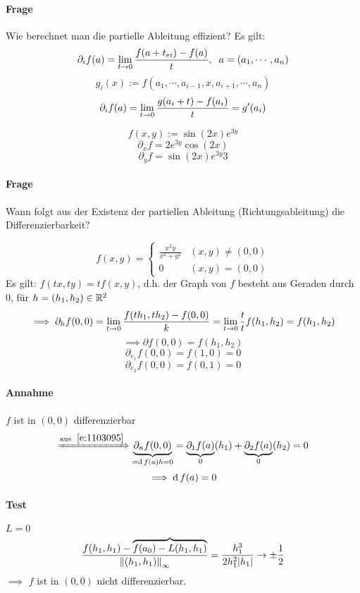 \paragraph{Frage}
Wie berechnet man die partielle Ableitung effizient? Es gilt:
\[\partial_if(a)=\displaystyle\lim_{t\rightarrow0}\frac{f(a+t_{ei})-f(a)}{t},\hspace{2mm} a=(a_1,\cdots,a_n)\]
\[g_i(x):=f(a_1,\cdots,a_{i-1},x,a_{i+1},\cdots,a_n)\]
\[\partial_if(a)=\displaystyle\lim_{t\rightarrow0}\frac{g(a_i+t)-f(a_i)}{t}=g'(a_i)\]
\begin{Bsp}
  \[f(x,y):=\sin(2x)e^{3y}\]
  \[\partial_xf=2e^{3y}\cos(2x)\]
  \[\partial_yf=\sin(2x)e^{3y}3\]
\end{Bsp}
\paragraph{Frage}
Wann folgt aus der Existenz der partiellen Ableitung (Richtungsableitung) die Differenzierbarkeit?
\begin{Bsp}
  \[f(x,y)= \begin{cases}
    \frac{x^2y}{x^2+y^2}&(x,y)\neq(0,0)\\
    0&(x,y)=(0,0)
  \end{cases}\]
  Es gilt: $f(tx,ty)=tf(x,y)$, d.h. der Graph von $f$ besteht aus Geraden durch $0$, für $h=(h_1,h_2)\in\mathbb{R}^2$
  \[\implies \partial_hf(0,0)=\displaystyle\lim_{t\rightarrow0}\frac{f(th_1,th_2)-f(0,0)}{k}=\displaystyle\lim_{t\rightarrow0}\frac{t}{t}f(h_1,h_2)=f(h_1,h_2)\]
  \[\implies \partial f(0,0)=f(h_1,h_2)\]
  \[\partial_{e_1}f(0,0)=f(1,0)=0\]
  \[\partial_{e_2}f(0,0)=f(0,1)=0\]
  \paragraph{Annahme}
  $f$ ist in $(0,0)$ differenzierbar
  \[\xRightarrow{\text{aus}\hspace{2mm}\ref{e:1103095}}\underbrace{\partial_nf(0,0)}_{=\operatorname{d} f(a)h=0}=\underbrace{\partial_1f(a)}_{0}(h_1)+\underbrace{\partial_2f(a)}_0(h_2)=0\]
  \[\implies \operatorname{d} f(a)=0\]
  \paragraph{Test}
  $L=0$
  \[\frac{f(h_1,h_1)-\overbrace{f(a_0)-L(h_1,h_1)}}{\left\| (h_1,h_1) \right\|_\infty}=\frac{h_1^3}{2h_1^2\mathopen| h_1 \mathclose|}\rightarrow\pm\frac{1}{2}\]
  $\implies$ $f$ ist in $(0,0)$ nicht differenzierbar.
\end{Bsp}

